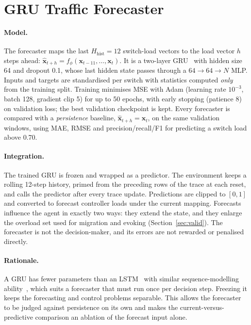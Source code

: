 \section{GRU Traffic Forecaster}
\label{sec:gru}

\paragraph{Model.} The forecaster maps the last $H_{\text{hist}}=12$ switch-load vectors to the load vector $h$ steps ahead: $\hat{\mathbf{x}}_{t+h}=f_\phi(\mathbf{x}_{t-11},\dots,\mathbf{x}_t)$. It is a two-layer GRU~\cite{cho2014gru} with hidden size 64 and dropout 0.1, whose last hidden state passes through a $64\to64\to N$ MLP. Inputs and targets are standardised per switch with statistics computed \emph{only} from the training split. Training minimises MSE with Adam (learning rate $10^{-3}$, batch 128, gradient clip 5) for up to 50 epochs, with early stopping (patience 8) on validation loss; the best validation checkpoint is kept. Every forecaster is compared with a \emph{persistence} baseline, $\hat{\mathbf{x}}_{t+h}=\mathbf{x}_t$, on the same validation windows, using MAE, RMSE and precision/recall/F1 for predicting a switch load above 0.70.

\paragraph{Integration.} The trained GRU is frozen and wrapped as a predictor. The environment keeps a rolling 12-step history, primed from the preceding rows of the trace at each reset, and calls the predictor after every trace update. Predictions are clipped to $[0,1]$ and converted to forecast controller loads under the current mapping. Forecasts influence the agent in exactly two ways: they extend the state, and they enlarge the overload set used for migration and evoking (Section~\ref{sec:valid}). The forecaster is not the decision-maker, and its errors are not rewarded or penalised directly.

\paragraph{Rationale.} A GRU has fewer parameters than an LSTM~\cite{hochreiter1997lstm} with similar sequence-modelling ability~\cite{chung2014gru}, which suits a forecaster that must run once per decision step. Freezing it keeps the forecasting and control problems separable. This allows the forecaster to be judged against persistence on its own and makes the current-versus-predictive comparison an ablation of the forecast input alone.

